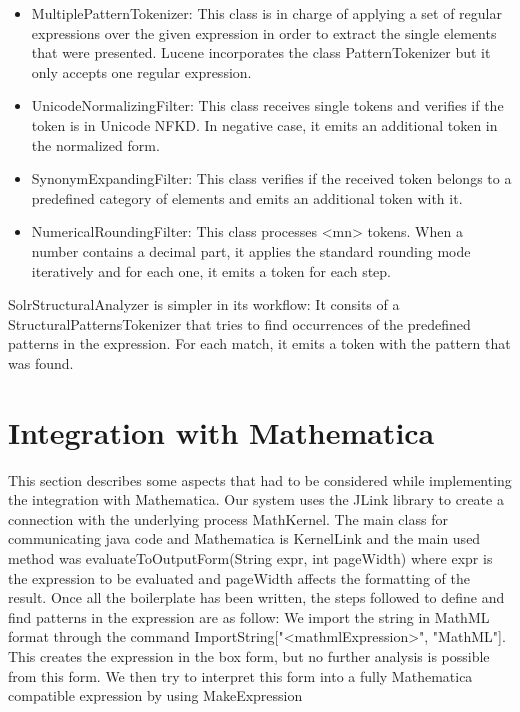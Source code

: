 \begin{itemize}
\item {\codefont MultiplePatternTokenizer}: This class is in charge of applying a set of regular expressions over the given expression in order to extract the single elements that were presented. Lucene incorporates the class {\codefont PatternTokenizer} but it only accepts one regular expression.
\item {\codefont UnicodeNormalizingFilter}: This class receives single tokens and verifies if the token is in Unicode NFKD. In negative case, it emits an additional token in the normalized form.
\item {\codefont SynonymExpandingFilter}: This class verifies if the received token belongs to a predefined category of elements and emits an additional token with it.
\item {\codefont NumericalRoundingFilter}: This class processes {\codefont <mn>} tokens. When a number contains a decimal part, it applies the standard rounding mode iteratively and for each one, it emits a token for each step. 
\end{itemize}

{\codefont SolrStructuralAnalyzer } is simpler in its workflow: It consits of a {\codefont StructuralPatternsTokenizer} that tries to find occurrences of the predefined patterns in the expression. For each match, it emits a token with the pattern that was found. 

\section{Integration with Mathematica}
This section describes some aspects that had to be considered while implementing the integration with Mathematica. Our system uses the {\codefont JLink} library to create a connection with the underlying process {\codefont MathKernel}. The main class for communicating java code and {\codefont Mathematica} is {\codefont KernelLink} and the main used method was {\codefont evaluateToOutputForm(String expr, int pageWidth)} where {\codefont expr} is the expression to be evaluated and {\codefont pageWidth} affects the formatting of the result.
Once all the boilerplate has been written, the steps followed to define and find patterns in the expression are as follow: We import the string in MathML format through the command {\codefont ImportString["<mathmlExpression>", "MathML"]}. This creates the expression in the box form, but no further analysis is possible from this form. We then try to interpret this form into a fully Mathematica compatible expression by using {\codefont MakeExpression}

